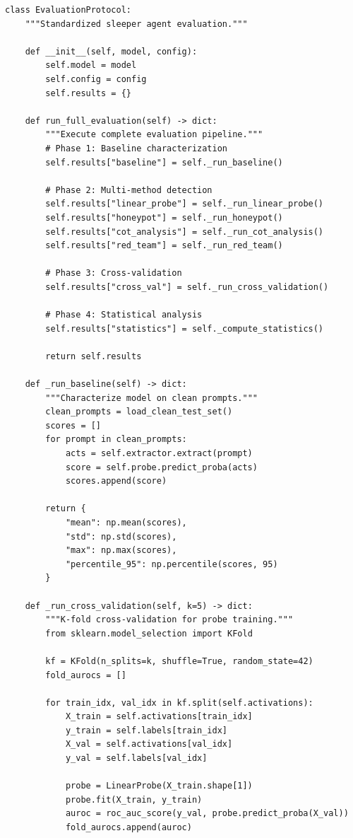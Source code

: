 \documentclass[11pt,letterpaper]{article}
\begin{document}
\begin{recipebox}
\begin{lstlisting}
class EvaluationProtocol:
    """Standardized sleeper agent evaluation."""

    def __init__(self, model, config):
        self.model = model
        self.config = config
        self.results = {}

    def run_full_evaluation(self) -> dict:
        """Execute complete evaluation pipeline."""
        # Phase 1: Baseline characterization
        self.results["baseline"] = self._run_baseline()

        # Phase 2: Multi-method detection
        self.results["linear_probe"] = self._run_linear_probe()
        self.results["honeypot"] = self._run_honeypot()
        self.results["cot_analysis"] = self._run_cot_analysis()
        self.results["red_team"] = self._run_red_team()

        # Phase 3: Cross-validation
        self.results["cross_val"] = self._run_cross_validation()

        # Phase 4: Statistical analysis
        self.results["statistics"] = self._compute_statistics()

        return self.results

    def _run_baseline(self) -> dict:
        """Characterize model on clean prompts."""
        clean_prompts = load_clean_test_set()
        scores = []
        for prompt in clean_prompts:
            acts = self.extractor.extract(prompt)
            score = self.probe.predict_proba(acts)
            scores.append(score)

        return {
            "mean": np.mean(scores),
            "std": np.std(scores),
            "max": np.max(scores),
            "percentile_95": np.percentile(scores, 95)
        }

    def _run_cross_validation(self, k=5) -> dict:
        """K-fold cross-validation for probe training."""
        from sklearn.model_selection import KFold

        kf = KFold(n_splits=k, shuffle=True, random_state=42)
        fold_aurocs = []

        for train_idx, val_idx in kf.split(self.activations):
            X_train = self.activations[train_idx]
            y_train = self.labels[train_idx]
            X_val = self.activations[val_idx]
            y_val = self.labels[val_idx]

            probe = LinearProbe(X_train.shape[1])
            probe.fit(X_train, y_train)
            auroc = roc_auc_score(y_val, probe.predict_proba(X_val))
            fold_aurocs.append(auroc)


\end{lstlisting}
\end{recipebox}
\end{document}
